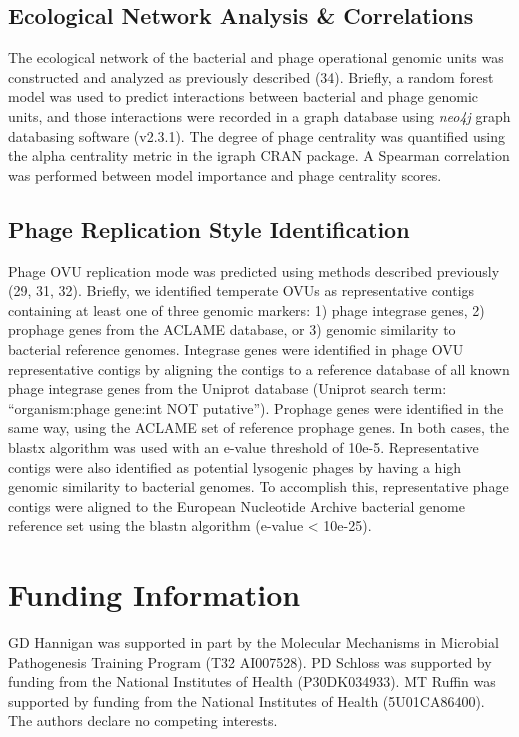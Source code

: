\documentclass[12pt,]{article}
\begin{document}
\subsection{Ecological Network Analysis \&
Correlations}\label{ecological-network-analysis-correlations}

The ecological network of the bacterial and phage operational genomic
units was constructed and analyzed as previously described (34).
Briefly, a random forest model was used to predict interactions between
bacterial and phage genomic units, and those interactions were recorded
in a graph database using \emph{neo4j} graph databasing software
(v2.3.1). The degree of phage centrality was quantified using the alpha
centrality metric in the igraph CRAN package. A Spearman correlation was
performed between model importance and phage centrality scores.

\subsection{Phage Replication Style
Identification}\label{phage-replication-style-identification}

Phage OVU replication mode was predicted using methods described
previously (29, 31, 32). Briefly, we identified temperate OVUs as
representative contigs containing at least one of three genomic markers:
1) phage integrase genes, 2) prophage genes from the ACLAME database, or
3) genomic similarity to bacterial reference genomes. Integrase genes
were identified in phage OVU representative contigs by aligning the
contigs to a reference database of all known phage integrase genes from
the Uniprot database (Uniprot search term: ``organism:phage gene:int NOT
putative''). Prophage genes were identified in the same way, using the
ACLAME set of reference prophage genes. In both cases, the blastx
algorithm was used with an e-value threshold of 10e-5. Representative
contigs were also identified as potential lysogenic phages by having a
high genomic similarity to bacterial genomes. To accomplish this,
representative phage contigs were aligned to the European Nucleotide
Archive bacterial genome reference set using the blastn algorithm
(e-value \textless{} 10e-25).

\section{Funding Information}\label{funding-information}

GD Hannigan was supported in part by the Molecular Mechanisms in
Microbial Pathogenesis Training Program (T32 AI007528). PD Schloss was
supported by funding from the National Institutes of Health
(P30DK034933). MT Ruffin was supported by funding from the National
Institutes of Health (5U01CA86400). The authors declare no competing
interests.
\end{document}
